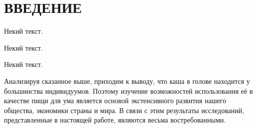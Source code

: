 

\newpage
\chapter*{ВВЕДЕНИЕ}

Некий текст.


Некий текст.



Некий текст.


Анализируя сказанное выше,
приходим к выводу, что каша в голове находится у большинства индивидуумов.
Поэтому изучение возможностей использования её в качестве пищи для ума является основой экстенсивного развития нашего общества, экономики страны и мира. 
В связи с этим результаты исследований, представленные в настоящей работе, являются весьма востребованными.



